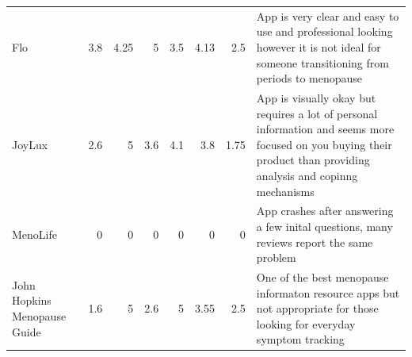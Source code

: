 \begin{table}[h!!]
\begin{tabular}{lrrrr
            >{\columncolor[HTML]{EFEFEF}}r 
            >{\columncolor[HTML]{EFEFEF}}r l}
                Flo                          & 3.8                                     & 4.25                                       & 5                                       & 3.5                                      & 4.13                                                             & 2.5                                                             & App is very clear and easy to use and professional looking however it is not ideal for someone transitioning from periods to menopause                                                                                                                                                                                                                                                     \\
                JoyLux                       & 2.6                                     & 5                                          & 3.6                                     & 4.1                                      & 3.8                                                              & 1.75                                                            & App is visually okay but requires a lot of personal information and seems more focused on you buying their product than providing analysis and copinng mechanisms                                                                                                                                                                                                                          \\
                MenoLife                     & 0                                       & 0                                          & 0                                       & 0                                        & 0                                                                & 0                                                               & App crashes after answering a few inital questions, many reviews report the same problem                                                                                                                                                                                                                                                                                                   \\
                John Hopkins Menopause Guide & 1.6                                     & 5                                          & 2.6                                     & 5                                        & 3.55                                                             & 2.5                                                             & One of the best menopause informaton resource apps but not appropriate for those looking for everyday symptom tracking                                                                                                                                                                                                                                                                     \\ \hline
            \end{tabular}
    \end{table}